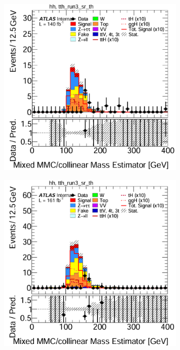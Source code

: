 \begin{figure}[htbp]
  \begin{subfigure}[t]{0.45\textwidth}
    \centering
    \includegraphics[width=\linewidth]{images/mmc_th_tth/run_2_w_mmc_th.png}
  \end{subfigure}
  \hfill
  \begin{subfigure}[t]{0.45\textwidth}
    \centering
    \includegraphics[width=\linewidth]{images/mmc_th_tth/run_3_w_mmc_th.png}
  \end{subfigure}


\end{figure}
